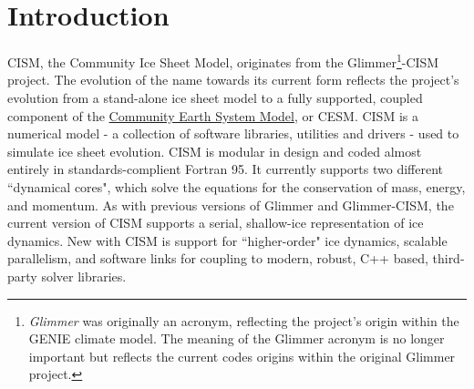 
\section{Introduction}
%
CISM, the Community Ice Sheet Model, originates from the Glimmer\footnote{{\it Glimmer} was originally an acronym, reflecting the project's origin within the GENIE climate model. The meaning of the Glimmer acronym is no longer important but reflects the current codes origins within the original Glimmer project.}-CISM project. The evolution of the name towards its current form reflects the project's evolution from a stand-alone ice sheet model to a fully supported, coupled component of the \href{http://www2.cesm.ucar.edu/}{Community Earth System Model}, or CESM. CISM is a numerical model - a collection of software libraries, utilities and drivers  - used to simulate ice sheet evolution. CISM is modular in design and coded almost entirely in standards-complient Fortran 95. It currently supports two different ``dynamical cores", which solve the equations for the conservation of mass, energy, and momentum. As with previous versions of Glimmer and Glimmer-CISM, the current version of CISM supports a serial, shallow-ice representation of ice dynamics. New with CISM is support for ``higher-order" ice dynamics, scalable parallelism, and software links for coupling to modern, robust, C++ based, third-party solver libraries. 
%

